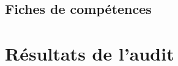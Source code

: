 \documentclass[asi]{picInsa}
\begin{document}
\section{Fiches de compétences}



\chapter{Résultats de l'audit}
\label{Resultats}

 
\begin{appendix}
\listoffigures
{}
	 
\listoftables
{}
\end{appendix}
\pageQuatriemeCouverture
\end{document}
